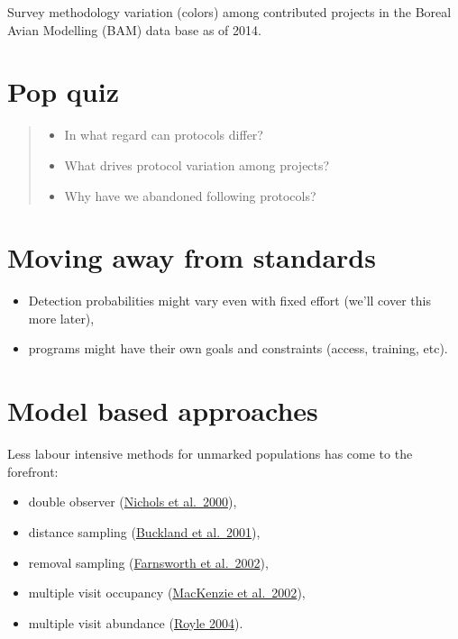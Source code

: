 \documentclass[12pt,]{scrbook}
\providecommand{\tightlist}{%
  \setlength{\itemsep}{0pt}\setlength{\parskip}{0pt}}
\begin{document}
Survey methodology variation (colors) among contributed projects
in the Boreal Avian Modelling (BAM) data base as of 2014.

\hypertarget{pop-quiz}{%
\section{Pop quiz}\label{pop-quiz}}

\begin{quote}
\begin{itemize}
\tightlist
\item
  In what regard can protocols differ?
\item
  What drives protocol variation among projects?
\item
  Why have we abandoned following protocols?
\end{itemize}
\end{quote}

\hypertarget{moving-away-from-standards}{%
\section{Moving away from standards}\label{moving-away-from-standards}}

\begin{itemize}
\tightlist
\item
  Detection probabilities might vary even with fixed effort (we'll cover this more later),
\item
  programs might have their own goals and constraints (access, training, etc).
\end{itemize}

\hypertarget{model-based-approaches}{%
\section{Model based approaches}\label{model-based-approaches}}

Less labour intensive methods for unmarked populations has come to the forefront:

\begin{itemize}
\tightlist
\item
  double observer (\href{https://doi.org/10.1642/0004-8038(2000)117\%5B0393:ADOAFE\%5D2.0.CO;2}{Nichols et al.~2000}),
\item
  distance sampling (\href{https://global.oup.com/academic/product/introduction-to-distance-sampling-9780198509271}{Buckland et al.~2001}),
\item
  removal sampling (\href{https://doi.org/10.1642/0004-8038(2002)119\%5B0414:ARMFED\%5D2.0.CO;2}{Farnsworth et al.~2002}),
\item
  multiple visit occupancy (\href{https://doi.org/10.1890/0012-9658(2002)083\%5B2248:ESORWD\%5D2.0.CO;2}{MacKenzie et al.~2002}),
\item
  multiple visit abundance (\href{https://doi.org/10.1111/j.0006-341X.2004.00142.x}{Royle 2004}).
\end{itemize}
\end{document}
